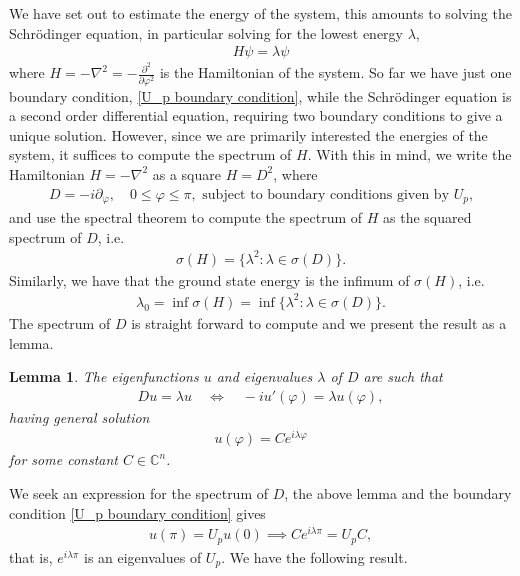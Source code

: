 \documentclass[a4paper,10pt,oneside]{book}
\theoremstyle{plain}
\newtheorem{lemma}[theorem]{Lemma}
\theoremstyle{definition}
\theoremstyle{remark}
\begin{document}
We have set out to estimate the energy of the system, this amounts to solving the Schrödinger equation, in particular solving for the lowest energy $λ$,
\begin{align*}
  H \psi = λ \psi
\end{align*}
where $H = -\nabla^2 = -\frac{\partial^2}{\partial\varphi^2}$ is the Hamiltonian of the system.
So far we have just one boundary condition, \cref{U_p boundary condition}, while the Schrödinger equation is a second order differential equation, requiring two boundary conditions to give a unique solution.
However, since we are primarily interested the energies of the system, it suffices to compute the spectrum of $H$. With this in mind, we write the Hamiltonian $H = -\nabla^2$ as a square $H = D^2$, where
\begin{align*}
  D = -i\partial_\varphi, \quad 0 \le \varphi \le π, \text{ subject to boundary conditions given by $U_p$,}
\end{align*}
and use the spectral theorem to compute the spectrum of $H$ as the squared spectrum of $D$, i.e.
\begin{align*}
  σ(H) = \{λ^2 : λ \in σ(D)\}.
\end{align*}
Similarly, we have that the ground state energy is the infimum of $σ(H)$, i.e.
\begin{align*}
  λ_0 = \inf σ(H) = \inf \{λ^2 : λ \in σ(D)\}.
\end{align*}
The spectrum of $D$ is straight forward to compute and we present the result as a lemma.

\begin{lemma}
  The eigenfunctions $u$ and eigenvalues $λ$ of $D$ are such that
  \begin{align*}
    D u = λ u \quad \iff \quad -iu'(\varphi) = λ u(\varphi),
  \end{align*}
  having general solution
  \begin{align*}
    u(\varphi) = C e^{iλ\varphi}
  \end{align*}
  for some constant $C \in \mathbb{C}^n$.
\end{lemma}

We seek an expression for the spectrum of $D$, the above lemma and the boundary condition \cref{U_p boundary condition} gives
\begin{align*}
  u(π) = U_p u(0) \implies
  C e^{iλπ} = U_p C,
\end{align*}
that is, $e^{iλπ}$ is an eigenvalues of $U_p$. We have the following result.
\end{document}
